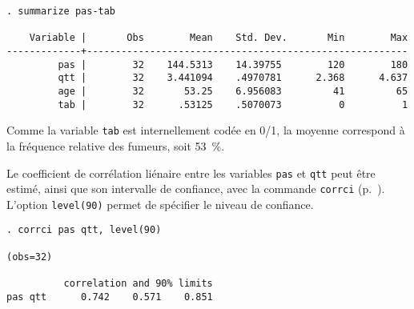 \begin{verbatim}
. summarize pas-tab

    Variable |       Obs        Mean    Std. Dev.       Min        Max
-------------+--------------------------------------------------------
         pas |        32    144.5313    14.39755        120        180
         qtt |        32    3.441094    .4970781      2.368      4.637
         age |        32       53.25    6.956083         41         65
         tab |        32      .53125    .5070073          0          1
\end{verbatim}
Comme la variable \texttt{tab} est internellement codée en 0/1, la moyenne
correspond à la fréquence relative des fumeurs, soit 53~\%.

Le coefficient de corrélation liénaire entre les variables \texttt{pas} et
\texttt{qtt} peut être estimé, ainsi que son intervalle de confiance, avec
la commande \texttt{corrci} (p.~\pageref{cmd:corrci}). L'option
\texttt{level(90)} permet de spécifier le niveau de confiance.
\begin{verbatim}
. corrci pas qtt, level(90)

(obs=32)

          correlation and 90% limits
pas qtt      0.742    0.571    0.851
\end{verbatim}

